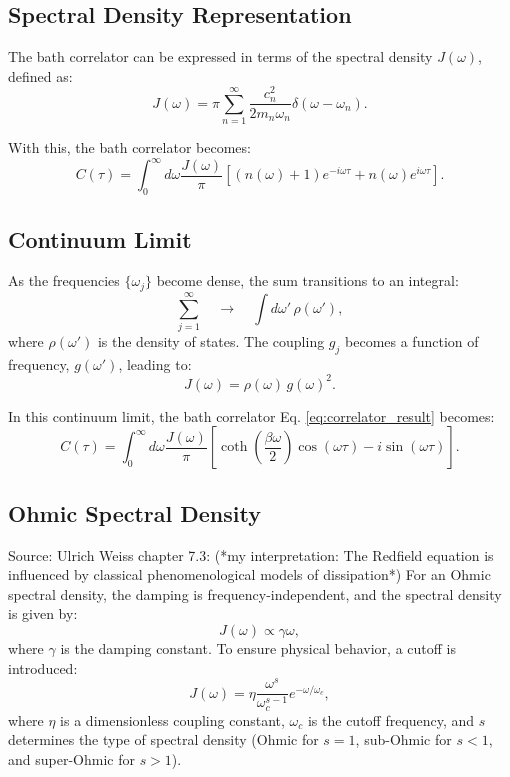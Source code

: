 \subsection{Spectral Density Representation}
\label{subsec:spectral_density}

The bath correlator can be expressed in terms of the spectral density \( J(\omega) \), defined as:
\begin{equation} \label{eq:spectral_density}
	J(\omega) = \pi \sum_{n=1}^{\infty} \frac{c_n^2}{2 m_n \omega_n} \delta(\omega - \omega_n).
\end{equation}

With this, the bath correlator becomes:
\begin{equation} \label{eq:correlator_spectral_density}
	C(\tau) = \int_0^\infty d\omega \frac{J(\omega)}{\pi} \left[ (n(\omega) + 1) e^{-i \omega \tau} + n(\omega) e^{i \omega \tau} \right].
\end{equation}

\subsection{Continuum Limit}
As the frequencies \( \{\omega_j\} \) become dense, the sum transitions to an integral:
\[
	\sum_{j=1}^{\infty} \quad \longrightarrow \quad \int d\omega'\,\rho(\omega'),
\]
where \( \rho(\omega') \) is the density of states. The coupling \( g_j \) becomes a function of frequency, \( g(\omega') \), leading to:
\[
	J(\omega) = \rho(\omega)\,g(\omega)^2.
\]

In this continuum limit, the bath correlator Eq. \eqref{eq:correlator_result} becomes:
\begin{equation} \label{eq:correlator_final}
	C(\tau) = \int_0^\infty d\omega \frac{J(\omega)}{\pi} \left[ \coth\left( \frac{\beta \omega}{2} \right) \cos(\omega \tau) - i \sin(\omega \tau) \right].
\end{equation}

\subsection{Ohmic Spectral Density}
\label{subsec:ohmic_spectral_density}

Source: Ulrich Weiss chapter 7.3:
(*my interpretation: The Redfield equation is influenced by classical phenomenological models of dissipation*)
For an Ohmic spectral density, the damping is frequency-independent, and the spectral density is given by:
\begin{equation} \label{eq:ohmic_spectral_density}
	J(\omega) \propto \gamma \omega,
\end{equation}
where \( \gamma \) is the damping constant. To ensure physical behavior, a cutoff is introduced:
\begin{equation} \label{eq:cutoff_spectral_density}
	J(\omega) = \eta \frac{\omega^s}{\omega_c^{s-1}} e^{-\omega / \omega_c},
\end{equation}
where \( \eta \) is a dimensionless coupling constant, \( \omega_c \) is the cutoff frequency, and \( s \) determines the type of spectral density (Ohmic for \( s = 1 \), sub-Ohmic for \( s < 1 \), and super-Ohmic for \( s > 1 \)).
